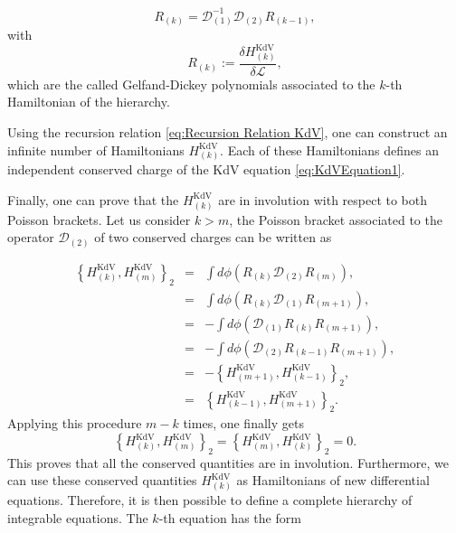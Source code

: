 \documentclass[letterpaper,11pt,oneside]{book}
\begin{document}
\begin{equation}
	R_{\left(k\right)}=\mathcal{D}_{\left(1\right)}^{-1}\mathcal{D}_{\left(2\right)}R_{\left(k-1\right)},\label{eq:Recursion Relation KdV}
\end{equation}
with 
\begin{equation}
	R_{\left(k\right)}:=\frac{\delta H_{\left(k\right)}^{\text{KdV}}}{\delta\mathcal{L}},\label{eq:Gelfand-Dickey KdV}
\end{equation}
which are the called Gelfand-Dickey polynomials associated to the
$k$-th Hamiltonian of the hierarchy.

Using the recursion relation \eqref{eq:Recursion Relation KdV}, one can construct an infinite number of Hamiltonians $H_{\left(k\right)}^{\text{KdV}}$. Each of these Hamiltonians defines an independent conserved charge of the KdV equation \eqref{eq:KdVEquation1}.

Finally, one can prove that the $H_{\left(k\right)}^{\text{KdV}}$
are in involution with respect to both Poisson brackets. Let us consider $k>m$,
the Poisson bracket associated to the operator $\mathcal{D}_{\left(2\right)}$
of two conserved charges can be written as

\begin{eqnarray*}
	\left\{ H_{\left(k\right)}^{\text{KdV}},H_{\left(m\right)}^{\text{KdV}}\right\} _{2} & = & \int d\phi\left(R_{\left(k\right)}\mathcal{D}_{\left(2\right)}R_{\left(m\right)}\right),\\
	& = & \int d\phi\left(R_{\left(k\right)}\mathcal{D}_{\left(1\right)}R_{\left(m+1\right)}\right),\\
	& = & -\int d\phi\left(\mathcal{D}_{\left(1\right)}R_{\left(k\right)}R_{\left(m+1\right)}\right),\\
	& = & -\int d\phi\left(\mathcal{D}_{\left(2\right)}R_{\left(k-1\right)}R_{\left(m+1\right)}\right),\\
	& = & -\left\{ H_{\left(m+1\right)}^{\text{KdV}},H_{\left(k-1\right)}^{\text{KdV}}\right\} _{2},\\
	& = & \left\{ H_{\left(k-1\right)}^{\text{KdV}},H_{\left(m+1\right)}^{\text{KdV}}\right\} _{2}.
\end{eqnarray*}
Applying this procedure $m-k$ times, one finally gets
\[
\left\{ H_{\left(k\right)}^{\text{KdV}},H_{\left(m\right)}^{\text{KdV}}\right\} _{2}=\left\{ H_{\left(m\right)}^{\text{KdV}},H_{\left(k\right)}^{\text{KdV}}\right\} _{2}=0.
\]
This proves that all the conserved quantities are in involution. Furthermore, we can use these conserved quantities $H_{\left(k\right)}^{\text{KdV}}$ as Hamiltonians of new differential equations. Therefore, it is then possible to define a complete hierarchy of integrable equations. The $k$-th equation has the form
\end{document}
